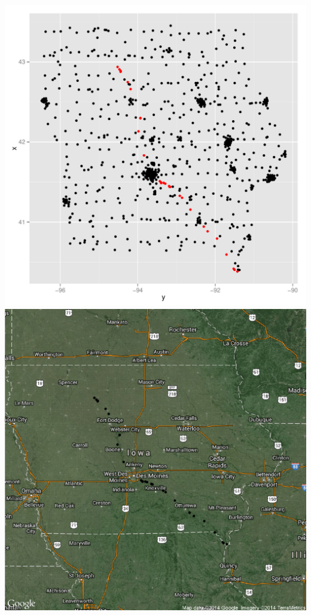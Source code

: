 \documentclass{article}\usepackage[]{graphicx}\usepackage[]{color}
\makeatletter
\def\maxwidth{ %
  \ifdim\Gin@nat@width>\linewidth
    \linewidth
  \else
    \Gin@nat@width
  \fi
}
\newenvironment{knitrout}{}{} %
\makeatother
\begin{document}
\begin{itemize}
\begin{knitrout}
{\includegraphics[width=\maxwidth]{figure/minimal-census3} 
\includegraphics[width=\maxwidth]{figure/minimal-census4} 
}
\end{knitrout}
\end{itemize}
\end{document}
